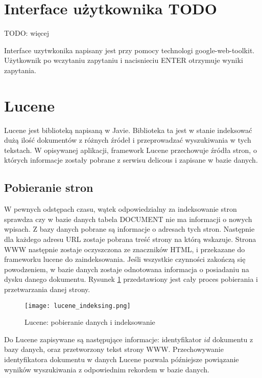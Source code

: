 \section{Interface użytkownika TODO}

TODO: więcej

Interface uzytwkonika napisany jest przy pomocy technologi google-web-toolkit. Użytkownik po wczytaniu zapytaniu i nacisnieciu ENTER otrzymuje wyniki zapytania.

\section{Lucene}

Lucene jest biblioteką napisaną w Javie. Biblioteka ta jest w stanie indeksować dużą ilość dokumentów z różnych źródeł i przeprowadzać wyszukiwania w tych tekstach. W opisywanej aplikacji, framework Lucene przechowuje źródła stron, o których informacje zostały pobrane z serwisu delicous i zapisane w bazie danych. 

\subsection{Pobieranie stron}

W pewnych odstępach czasu, wątek odpowiedzialny za indeksowanie stron sprawdza czy w bazie danych tabela DOCUMENT nie ma informacji o nowych wpisach. Z bazy danych pobrane są informacje o adresach tych stron. Następnie dla każdego adresu URL zostaje pobrana treść strony na którą wskazuje. Strona WWW następnie zostaje oczyszczona ze znaczników HTML, i przekazane do frameworku lucene do zaindeksowania. Jeśli wszystkie czynności zakończą się powodzeniem, w bazie danych zostaje odnotowana informacja o posiadaniu na dysku danego dokumentu. Rysunek \ref{fig:lucene_index_fig} przedstawiony jest cały proces pobierania i przetwarzania danej strony.

\begin{figure}[htb]

\texttt{[image: lucene\_indeksing.png]}
\caption{Lucene: pobieranie danych i indeksowanie}
\label{fig:lucene_index_fig}
\end{figure}

Do Lucene zapisywane są następujące informacje: identyfikator $id$ dokumentu z bazy danych, oraz przetworzony tekst strony WWW. Przechowywanie identyfikatora dokumentu w danych Lucene pozwala późniejsze powiązanie wyników wyszukiwania z odpowiednim rekordem w bazie danych. 

